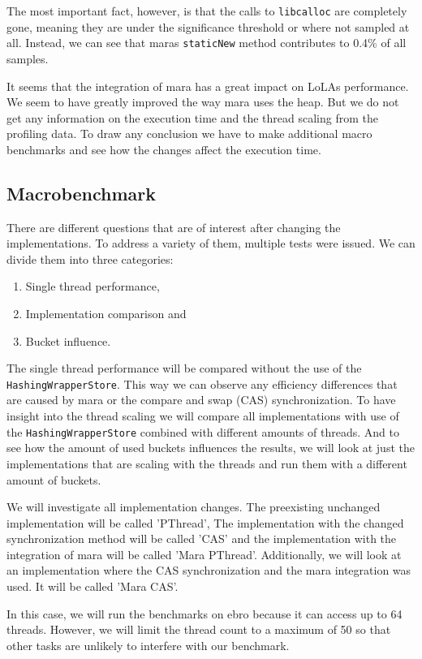 The most important fact, however, is that the calls to \texttt{libcalloc} are completely gone, meaning they are under the significance threshold or where not sampled at all. Instead, we can see that maras \texttt{staticNew} method contributes to 0.4\% of all samples.

It seems that the integration of mara has a great impact on LoLAs performance. We seem to have greatly improved the way mara uses the heap. But we do not get any information on the execution time and the thread scaling from the profiling data. To draw any conclusion we have to make additional macro benchmarks and see how the changes affect the execution time.

\subsection{Macrobenchmark}

There are different questions that are of interest after changing the implementations. To address a variety of them, multiple tests were issued. We can divide them into three categories:
\begin{enumerate}
    \item Single thread performance,
    \item Implementation comparison and
    \item Bucket influence.
\end{enumerate}
The single thread performance will be compared without the use of the \texttt{Hashing\-Wrapper\-Store}. This way we can observe any efficiency differences that are caused by mara or the compare and swap (CAS) synchronization.
To have insight into the thread scaling we will compare all implementations with use of the \texttt{Hashing\-Wrapper\-Store} combined with different amounts of threads.
And to see how the amount of used buckets influences the results, we will look at just the implementations that are scaling with the threads and run them with a different amount of buckets.

We will investigate all implementation changes. The preexisting unchanged implementation will be called 'PThread', The implementation with the changed synchronization method will be called 'CAS' and the implementation with the integration of mara will be called 'Mara PThread'. Additionally, we will look at an implementation where the CAS synchronization and the mara integration was used. It will be called 'Mara CAS'.

In this case, we will run the benchmarks on ebro because it can access up to 64 threads. However, we will limit the thread count to a maximum of 50 so that other tasks are unlikely to interfere with our benchmark.

